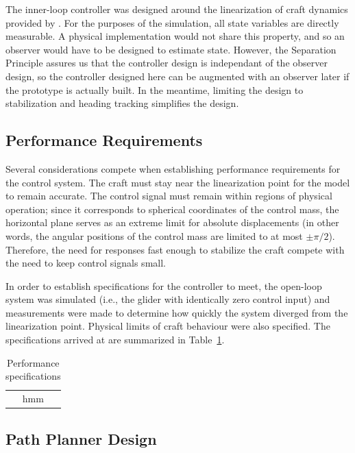 \documentclass{sydeStyle}
\begin{document}
The inner-loop controller was designed around the linearization of craft
dynamics provided by \cite{spottiswoode}.  For the purposes of the simulation,
all state variables are directly measurable.  A physical implementation would
not share this property, and so an observer would have to be designed to
estimate state.  However, the Separation Principle assures us that the
controller design is independant of the observer design, so the controller
designed here can be augmented with an observer later if the prototype is
actually built.  In the meantime, limiting the design to stabilization and
heading tracking simplifies the design.

\subsection{Performance Requirements}

Several considerations compete when establishing performance requirements for
the control system.  The craft must stay near the linearization point for the
model to remain accurate.  The control signal must remain within regions of
physical operation; since it corresponds to spherical coordinates of the control
mass, the horizontal plane serves as an extreme limit for absolute displacements
(in other words, the angular positions of the control mass are limited to at
most $\pm \pi/2$).  Therefore, the need for responses fast enough to stabilize
the craft compete with the need to keep control signals small.

In order to establish specifications for the controller to meet, the open-loop
system was simulated (i.e., the glider with identically zero control input) and
measurements were made to determine how quickly the system diverged from the
linearization point.  Physical limits of craft behaviour were also specified.
The specifications arrived at are summarized in Table~\ref{tab:specs}.

\begin{table}[b]
    \centering
    \begin{tabular}{|c|}
        hmm
    \end{tabular}
    \caption{Performance specifications}
    \label{tab:specs}
\end{table}

\subsection{Path Planner Design}
\end{document}
